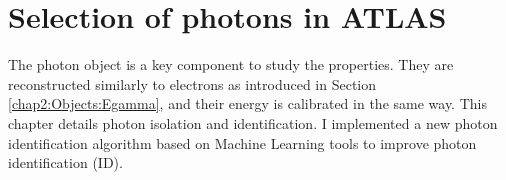 \chapter{Selection of photons in ATLAS}
\label{gamma}
The photon object is a key component to study the \HHyybb properties. They are reconstructed similarly to electrons as introduced in Section \ref{chap2:Objects:Egamma}, and their energy is calibrated in the same way. This chapter details photon isolation and identification. I implemented a new photon identification algorithm based on Machine Learning tools to improve photon identification (ID).

